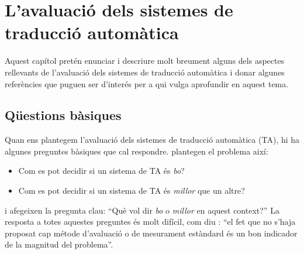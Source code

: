 \chapter[Avaluació de la traducció automàtica]{L'avaluació dels sistemes de traducció
  automàtica}
\label{se:ASTA}














Aquest capítol pretén enunciar i descriure molt breument
alguns dels aspectes rellevants de l'avaluació dels sistemes de
traducció automàtica i donar algunes referències que
puguen ser d'interés per a qui vulga aprofundir en aquest tema.

\section{Qüestions bàsiques} 
Quan ens plantegem l'avaluació dels
sistemes de traducció automàtica (TA), hi ha algunes preguntes
bàsiques que cal respondre. \citet{arnold94b} plantegen
el problema així:
\begin{itemize}
\item Com es pot decidir si un sistema de TA és \emph{bo}?
\item Com es pot decidir si un sistema de TA és \emph{millor} que
  un altre?
\end{itemize}
i afegeixen la pregunta clau: 
``Què vol dir \emph{bo} o \emph{millor} en aquest
context?'' La resposta a totes aquestes preguntes és molt difícil,
com diu \citet{minnis94j}: ``el fet que no s'haja proposat cap métode
d'avaluació o de mesurament estàndard és un bon indicador
de la magnitud del problema''. 

